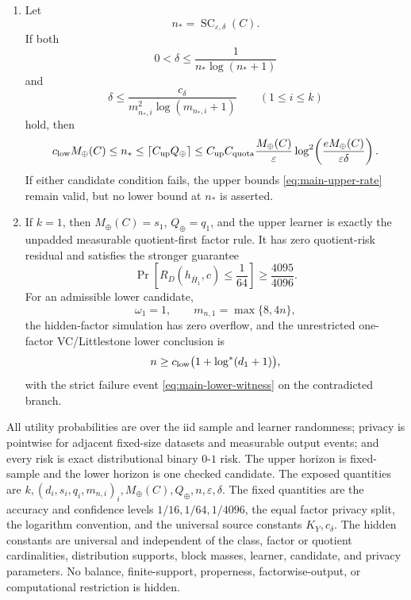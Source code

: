 \begin{theorem}
\begin{enumerate}
\item Let
\[
n_*=\operatorname{SC}_{\varepsilon,\delta}(C).
\]
If both
\begin{equation}\label{eq:main-nstar-global-cap}
0<\delta\le\frac1{n_*\log(n_*+1)}
\end{equation}
and
\begin{equation}\label{eq:main-nstar-factor-caps}
\delta\le
\frac{c_\delta}
{m_{n_*,i}^2\log(m_{n_*,i}+1)}
\qquad(1\le i\le k)
\end{equation}
hold, then
\begin{equation}\label{eq:main-sandwich}
c_{\rm low}M_\oplus(C)
\le n_*
\le\left\lceil C_{\rm up}Q_\oplus\right\rceil
\le C_{\rm up}C_{\rm quota}
\frac{M_\oplus(C)}{\varepsilon}
\log^2\!\left(
\frac{eM_\oplus(C)}{\varepsilon\delta}
\right).
\end{equation}
If either candidate condition fails, the upper bounds
\eqref{eq:main-upper-rate} remain valid, but no lower bound at \(n_*\)
is asserted.

\item If \(k=1\), then \(M_\oplus(C)=s_1\),
\(Q_\oplus=q_1\), and the upper learner is exactly the unpadded
measurable quotient-first factor rule.  It has zero quotient-risk
residual and satisfies the stronger guarantee
\begin{equation}\label{eq:main-one-factor-upper}
\Pr\left[R_D(h_{\bar H_1},c)\le\frac1{64}\right]
\ge\frac{4095}{4096}.
\end{equation}
For an admissible lower candidate,
\[
\omega_1=1,
\qquad
m_{n,1}=\max\{8,4n\},
\]
the hidden-factor simulation has zero overflow, and the unrestricted
one-factor VC/Littlestone lower conclusion is
\begin{equation}\label{eq:main-one-factor-lower}
n\ge c_{\rm low}\bigl(1+\log^*(d_1+1)\bigr),
\end{equation}
with the strict failure event \eqref{eq:main-lower-witness} on the
contradicted branch.
\end{enumerate}

All utility probabilities are over the iid sample and learner
randomness; privacy is pointwise for adjacent fixed-size datasets and
measurable output events; and every risk is exact distributional binary
\(0\)-\(1\) risk.  The upper horizon is fixed-sample and the lower
horizon is one checked candidate.  The exposed quantities are
\(k,(d_i,s_i,q_i,m_{n,i})_i,M_\oplus(C),Q_\oplus,n,\varepsilon,\delta\).
The fixed quantities are the accuracy and confidence levels
\(1/16,1/64,1/4096\), the equal factor privacy split, the logarithm
convention, and the universal source constants \(K_Y,c_\delta\).
The hidden constants are universal and independent of the class,
factor or quotient cardinalities, distribution supports, block masses,
learner, candidate, and privacy parameters.  No balance, finite-support,
properness, factorwise-output, or computational restriction is hidden.
\end{theorem}


